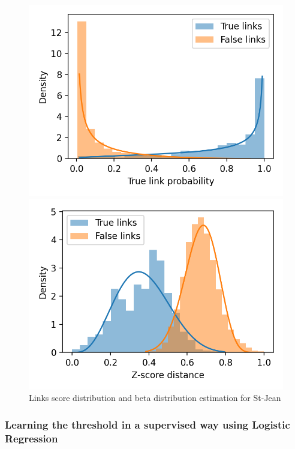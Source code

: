 \begin{figure}
  \caption{Links score distribution and beta distribution estimation for St-Jean}
  \label{fig:links_score_density}

  \label{fig:links_score_density_fusion_regression}
  \includegraphics[width=\linewidth]{img/links_score_density_fusion_regression.png}

  \label{fig:links_score_density_fusion_z_score}
  \includegraphics[width=\linewidth]{img/links_score_density_fusion_z_score.png}
\end{figure}

\subsubsection{Learning the threshold in a supervised way using Logistic Regression}


